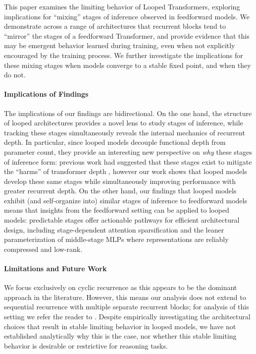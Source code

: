 \documentclass{article}
\theoremstyle{plain}
\theoremstyle{definition}
\theoremstyle{remark}
\begin{document}
This paper examines the limiting behavior of Looped Transformers, exploring implications for ``mixing'' stages of inference observed in feedforward models. We demonstrate across a range of architectures that recurrent blocks tend to ``mirror'' the stages of a feedforward Transformer, and provide evidence that this may be emergent behavior learned during training, even when not explicitly encouraged by the training process. We further investigate the implications for these mixing stages when models converge to a stable fixed point, and when they do not.

\paragraph{Implications of Findings}

The implications of our findings are bidirectional. On the one hand, the structure of looped architectures provides a novel lens to study stages of inference, while tracking these stages simultaneously reveals the internal mechanics of recurrent depth. In particular, since looped models decouple functional depth from parameter count, they provide an interesting new perspective on \emph{why} these stages of inference form: previous work had suggested that these stages exist to mitigate the ``harms'' of transformer depth \citep{barbero2025llms,queipo2025attention}, however our work shows that looped models develop these same stages while simultaneously improving performance with greater recurrent depth. On the other hand, our findings that looped models exhibit (and self-organize into) similar stages of inference to feedforward models means that insights from the feedforward setting can be applied to looped models: predictable stages offer actionable pathways for efficient architectural design, including stage-dependent attention sparsification and the leaner parameterization of middle-stage MLPs where representations are reliably compressed and low-rank.

\paragraph{Limitations and Future Work}

We focus exclusively on cyclic recurrence as this appears to be the dominant approach in the literature. However, this means our analysis does not extend to sequential recurrence with multiple separate recurrent blocks; for analysis of this setting we refer the reader to \citet{pappone2025two}. Despite empirically investigating the architectural choices that result in stable limiting behavior in looped models, we have not established analytically why this is the case, nor whether this stable limiting behavior is desirable or restrictive for reasoning tasks.
\end{document}
